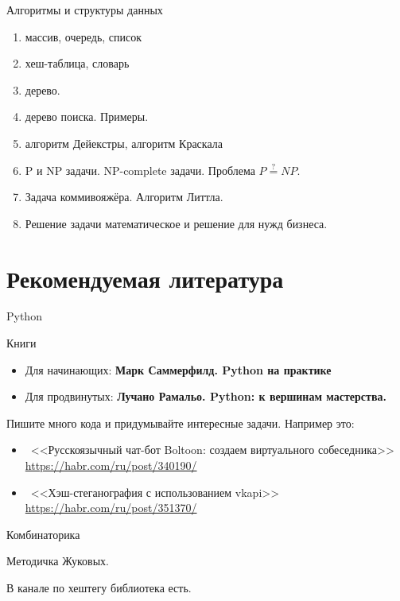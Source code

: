 \documentclass{beamer}
\newcommand{\рис}[1]{рис.\ref{#1}}
\newcommand{\Рис}[1]{Рис.\ref{#1}}
\newcommand{\таблицa}[1]{таблица~№\ref{#1}} %
\newcommand{\таблицы}[1]{таблицы~№\ref{#1}} %
\newcommand{\таблице}[1]{таблице~№\ref{#1}} %
\newcommand{\таблицу}[1]{таблицу~№\ref{#1}} %
\newcommand{\таблицей}[1]{таблицей~№\ref{#1}} %
\newcommand{\Таблицa}[1]{Таблица~№\ref{#1}} %
\newcommand{\Таблицы}[1]{Таблицы~№\ref{#1}} %
\newcommand{\Таблице}[1]{Таблице~№\ref{#1}} %
\newcommand{\Таблицу}[1]{Таблицу~№\ref{#1}} %
\newcommand{\Таблицей}[1]{Таблицей~№\ref{#1}} %
\begin{document}
  \begin{frame}{Алгоритмы и структуры данных}
   \begin{enumerate}
   	
     \item массив, очередь, список
     \item хеш-таблица, словарь
     \item дерево.
     \item дерево поиска. Примеры.
     \item алгоритм Дейекстры, алгоритм Краскала
     \item P и NP задачи. NP-complete задачи. Проблема $ P\stackrel{?}{=} NP$.
     \item Задача коммивояжёра. Алгоритм Литтла.  
     \item Решение задачи математическое и решение для нужд бизнеса.   
	\end{enumerate}
	\end{frame}
  
  \section{Рекомендуемая литература}\label{section:literature}
  
  \begin{frame}{Python}
  
  Книги
  \begin{itemize}
  	\item Для начинающих: 
  	\textbf{Марк Саммерфилд. Python на практике} 
  	\item 
  	Для продвинутых:
  	\textbf{Лучано Рамальо. Python: к вершинам мастерства.}
  \end{itemize}
  
  Пишите много кода и придумывайте интересные задачи. 
  Например это:
  \begin{itemize}
  	\item ~<<Русскоязычный чат-бот Boltoon: создаем виртуального собеседника>>
  	\url{https://habr.com/ru/post/340190/}
  	\item ~<<Хэш-стеганография с использованием vkapi>>
  	\url{https://habr.com/ru/post/351370/}
  \end{itemize}
\end{frame}
	
	\begin{frame}{Комбинаторика}
	
	Методичка Жуковых. 
	
	В канале по хештегу библиотека есть.
	
	\end{frame}
\end{document}
